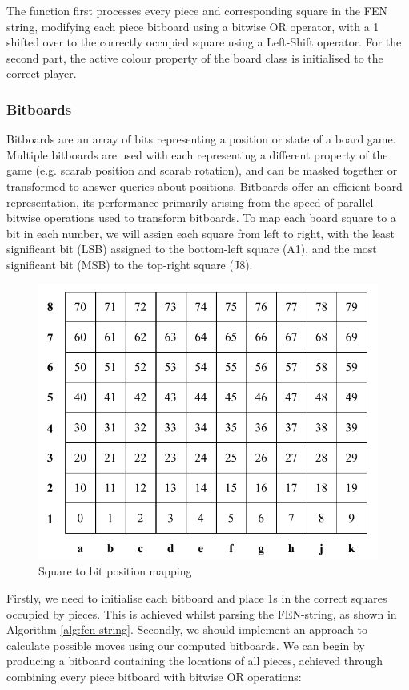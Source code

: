 \documentclass[../main/main.tex]{subfiles}
\begin{document}
The function first processes every piece and corresponding square in the FEN string, modifying each piece bitboard using a bitwise OR operator, with a 1 shifted over to the correctly occupied square using a Left-Shift operator. For the second part, the active colour property of the board class is initialised to the correct player.

\subsubsection*{Bitboards}
Bitboards are an array of bits representing a position or state of a board game. Multiple bitboards are used with each representing a different property of the game (e.g. scarab position and scarab rotation), and can be masked together or transformed to answer queries about positions. Bitboards offer an efficient board representation, its performance primarily arising from the speed of parallel bitwise operations used to transform bitboards.
To map each board square to a bit in each number, we will assign each square from left to right, with the least significant bit (LSB) assigned to the bottom-left square (A1), and the most significant bit (MSB) to the top-right square (J8).

\begin{figure}[H]
    \centering
    \includegraphics[width=0.6\columnwidth]{../design/assets/bitboard_indexes.pdf}
    \caption{Square to bit position mapping}
    \label{fig:bitboard-indexes}
\end{figure}

Firstly, we need to initialise each bitboard and place 1s in the correct squares occupied by pieces. This is achieved whilst parsing the FEN-string, as shown in Algorithm \ref{alg:fen-string}.
Secondly, we should implement an approach to calculate possible moves using our computed bitboards. We can begin by producing a bitboard containing the locations of all pieces, achieved through combining every piece bitboard with bitwise OR operations:
\end{document}
